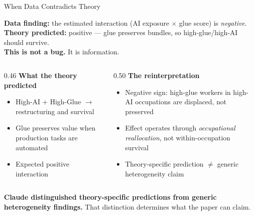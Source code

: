 \documentclass[10pt,english,aspectratio=169]{beamer}
\begin{document}
\begin{frame}{When Data Contradicts Theory}
\begin{tcolorbox}[colback=blue!3, colframe=RedTitle!60]
\textbf{Data finding:} the estimated interaction (AI exposure $\times$ glue score) is \emph{negative}.\\
\textbf{Theory predicted:} positive --- glue preserves bundles, so high-glue/high-AI should survive.\\
\textbf{This is not a bug.} It is information.
\end{tcolorbox}
\vspace{0.2cm}
\begin{columns}[T]
\begin{column}{0.46\textwidth}
\textbf{What the theory predicted}
\begin{itemize}\small
  \item High-AI + High-Glue $\to$ restructuring and survival
  \item Glue preserves value when production tasks are automated
  \item Expected positive interaction
\end{itemize}
\end{column}
\begin{column}{0.50\textwidth}
\textbf{The reinterpretation}
\begin{itemize}\small
  \item Negative sign: high-glue workers in high-AI occupations are displaced, not preserved
  \item Effect operates through \emph{occupational reallocation}, not within-occupation survival
  \item Theory-specific prediction $\neq$ generic heterogeneity claim
\end{itemize}
\end{column}
\end{columns}
\vspace{0.2cm}
\textbf{Claude distinguished theory-specific predictions from generic heterogeneity findings.} That distinction determines what the paper can claim.
\end{frame}
\end{document}
